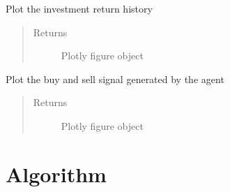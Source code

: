 \documentclass[letterpaper,10pt,english]{sphinxmanual}
\begin{document}
\begin{fulllineitems}
\begin{fulllineitems}
\begin{quote}
\begin{description}
\end{description}\end{quote}

\end{fulllineitems}


\begin{fulllineitems}
\label{\detokenize{Visualizer:crypto_env.visualizer.Visualizer.draw_return}}
\sphinxAtStartPar
Plot the investment return history
\begin{quote}\begin{description}
\item[{Returns}] \leavevmode
\sphinxAtStartPar
Plotly figure object

\end{description}\end{quote}

\end{fulllineitems}


\begin{fulllineitems}
\label{\detokenize{Visualizer:crypto_env.visualizer.Visualizer.draw_signal}}
\sphinxAtStartPar
Plot the buy and sell signal generated by the agent
\begin{quote}\begin{description}
\item[{Returns}] \leavevmode
\sphinxAtStartPar
Plotly figure object

\end{description}\end{quote}

\end{fulllineitems}


\end{fulllineitems}



\section{Algorithm}
\label{\detokenize{Algorithm:module-crypto_env.algorithm}}\label{\detokenize{Algorithm:algorithm}}\label{\detokenize{Algorithm::doc}}
\end{document}
